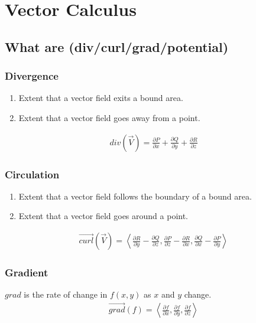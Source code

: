 \documentclass{article}
\begin{document}
\section{Vector Calculus}
\subsection{What are (div/curl/grad/potential)}
\subsubsection{Divergence}
\begin{enumerate}
\item Extent that a vector field exits a bound area.
\item Extent that a vector field goes away from a point.
\end{enumerate}
\begin{gather*}
div(\vec{V}) = \frac{\partial P}{\partial x} + \frac{\partial Q}{\partial y} + \frac{\partial R}{\partial z}
\end{gather*}
\subsubsection{Circulation}
\begin{enumerate}
\item Extent that a vector field follows the boundary of a bound area.
\item Extent that a vector field goes around a point.
\end{enumerate}
\begin{gather*}
\overrightarrow{curl}(\vec{V}) = \left<\frac{\partial R}{\partial y} - \frac{\partial Q}{\partial z}, \frac{\partial P}{\partial z} - \frac{\partial R}{\partial x}, \frac{\partial Q}{\partial x} - \frac{\partial P}{\partial y}\right>
\end{gather*}
\subsubsection{Gradient}
$grad$ is the rate of change in $f(x,y)$ as $x$ and $y$ change.
\begin{gather*}
\overrightarrow{grad}(f) = \left<\frac{\partial f}{\partial x}, \frac{\partial f}{\partial y},\frac{\partial f}{\partial z}\right>
\end{gather*}
\end{document}

